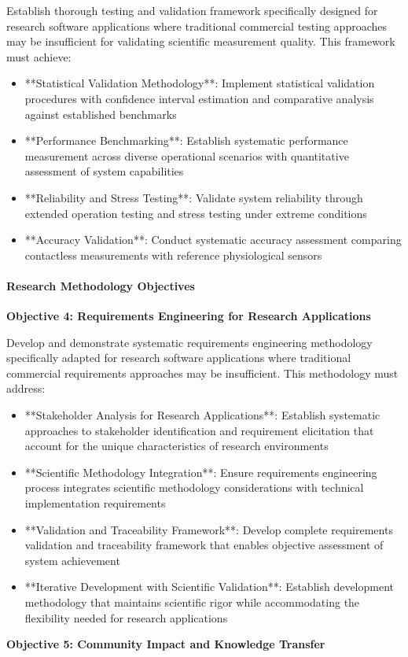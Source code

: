 \documentclass[11pt,a4paper]{article}
\begin{document}
Establish thorough testing and validation framework specifically designed for
research software applications where
traditional commercial testing approaches may be insufficient for validating
scientific measurement quality. This
framework must achieve:

\begin{itemize}
\item **Statistical Validation Methodology**: Implement statistical validation
procedures with confidence interval
  estimation and comparative analysis against established benchmarks
\item **Performance Benchmarking**: Establish systematic performance measurement
across diverse operational scenarios with
  quantitative assessment of system capabilities
\item **Reliability and Stress Testing**: Validate system reliability through
extended operation testing and stress testing
  under extreme conditions
\item **Accuracy Validation**: Conduct systematic accuracy assessment comparing
contactless measurements with reference
  physiological sensors

\end{itemize}
\paragraph{Research Methodology Objectives}

\textbf{Objective 4: Requirements Engineering for Research Applications}

Develop and demonstrate systematic requirements engineering methodology
specifically adapted for research software
applications where traditional commercial requirements approaches may be
insufficient. This methodology must address:

\begin{itemize}
\item **Stakeholder Analysis for Research Applications**: Establish systematic
approaches to stakeholder identification and
requirement elicitation that account for the unique characteristics of research
environments
\item **Scientific Methodology Integration**: Ensure requirements engineering
process integrates scientific methodology
  considerations with technical implementation requirements
\item **Validation and Traceability Framework**: Develop complete requirements
validation and traceability framework
  that enables objective assessment of system achievement
\item **Iterative Development with Scientific Validation**: Establish
development methodology that maintains scientific
  rigor while accommodating the flexibility needed for research applications

\end{itemize}
\textbf{Objective 5: Community Impact and Knowledge Transfer}
\end{document}
